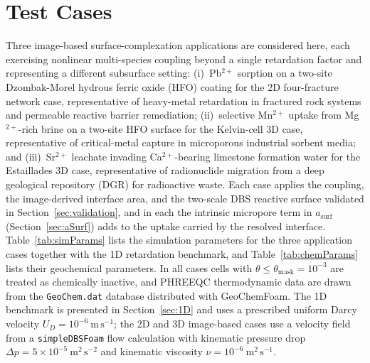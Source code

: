 \section{Test Cases}

Three image-based surface-complexation applications are considered here, each
exercising nonlinear multi-species coupling beyond a single retardation factor
and representing a different subsurface setting:
(i)~Pb$^{2+}$ sorption on a two-site Dzombak-Morel hydrous ferric oxide (HFO)
coating for the 2D four-fracture network case, representative of heavy-metal
retardation in fractured rock systems and permeable reactive barrier
remediation;
(ii)~selective Mn$^{2+}$ uptake from Mg$^{2+}$-rich brine on a two-site HFO
surface for the Kelvin-cell 3D case, representative of critical-metal capture
in microporous industrial sorbent media; and
(iii)~Sr$^{2+}$ leachate invading Ca$^{2+}$-bearing limestone formation water
for the Estaillades 3D case, representative of radionuclide migration from a
deep geological repository (DGR) for radioactive waste.
Each case applies the coupling, the image-derived interface area, and the
two-scale DBS reactive surface validated in Section~\ref{sec:validation}, and
in each the intrinsic micropore term in $a_{\mathrm{surf}}$
(Section~\ref{sec:aSurf}) adds to the uptake carried by the resolved interface.
Table~\ref{tab:simParams} lists the simulation parameters for the three
application cases together with the 1D retardation benchmark, and
Table~\ref{tab:chemParams} lists their geochemical parameters.
In all cases cells with $\theta \le \theta_{\mathrm{mask}} = 10^{-3}$ are
treated as chemically inactive, and PHREEQC thermodynamic data are drawn from
the \texttt{GeoChem.dat} database distributed with GeoChemFoam.
The 1D benchmark is presented in Section~\ref{sec:1D} and uses a prescribed
uniform Darcy velocity $U_D = 10^{-6}\ \mathrm{m\,s^{-1}}$; the 2D and 3D
image-based cases use a velocity field from a \texttt{simpleDBSFoam} flow
calculation with kinematic pressure drop
$\Delta p = 5\times10^{-5}\ \mathrm{m^{2}\,s^{-2}}$ and kinematic viscosity
$\nu = 10^{-6}\ \mathrm{m^{2}\,s^{-1}}$.

